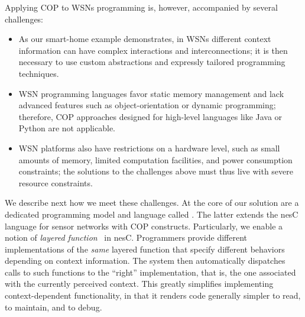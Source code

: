 Applying COP to WSNs programming is, however, accompanied by several challenges:
\begin{itemize}\compresslist
\item As our smart-home example demonstrates, in WSNs different
  context information can have complex interactions and
  interconnections; it is then necessary to use custom abstractions
  and expressly tailored programming techniques.
\item WSN programming languages favor static memory management and
  lack advanced features such as object-orientation or dynamic
  programming; therefore, COP approaches designed for high-level
  languages like Java or Python are not applicable.
\item WSN platforms also have restrictions on a hardware level, such
  as small amounts of memory, limited computation facilities, and
  power consumption constraints; the solutions to the challenges above
  must thus live with severe resource constraints.
\end{itemize}

We describe next how we meet these challenges. At the core of our
solution are a dedicated programming model and language
called {}. The latter extends the nesC~\cite{gay03:nesc}
language for sensor networks with COP constructs. Particularly, we
enable a notion of \emph{layered function}~\cite{hirschfeld08} in
nesC. Programmers provide different implementations of the \emph{same}
layered function that specify different behaviors depending on context
information. The system then automatically dispatches calls to such
functions to the ``right'' implementation, that is, the one associated
with the currently perceived context. This greatly simplifies
implementing context-dependent functionality, in that it renders code
generally simpler to read, to maintain, and to debug.


